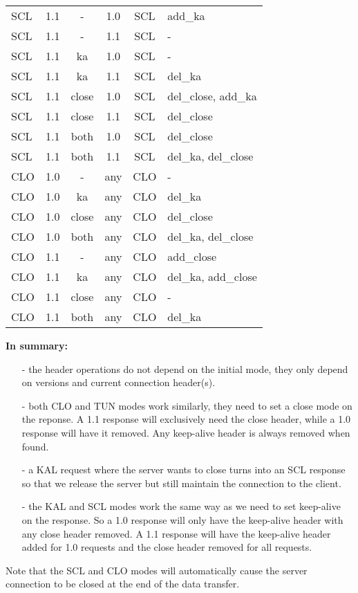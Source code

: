 \begin{longtable}{lccccl}
\hline
SCL  & 1.1   &    -    &  1.0   &   SCL   &   add\_ka \\
SCL  & 1.1   &    -    &  1.1   &   SCL   &    - \\
SCL  & 1.1   &   ka    &  1.0   &   SCL   &    - \\
SCL  & 1.1   &   ka    &  1.1   &   SCL   &   del\_ka \\
SCL  & 1.1   &  close  &  1.0   &   SCL   &   del\_close, add\_ka \\
SCL  & 1.1   &  close  &  1.1   &   SCL   &   del\_close \\
SCL  & 1.1   &  both   &  1.0   &   SCL   &   del\_close \\
SCL  & 1.1   &  both   &  1.1   &   SCL   &   del\_ka, del\_close \\
\hline
CLO  & 1.0   &    -    &  any   &   CLO   &    - \\
CLO  & 1.0   &   ka    &  any   &   CLO   &   del\_ka \\
CLO  & 1.0   &  close  &  any   &   CLO   &   del\_close \\
CLO  & 1.0   &  both   &  any   &   CLO   &   del\_ka, del\_close \\
\hline
CLO  & 1.1   &    -    &  any   &   CLO   &   add\_close \\
CLO  & 1.1   &   ka    &  any   &   CLO   &   del\_ka, add\_close \\
CLO  & 1.1   &  close  &  any   &   CLO   &    - \\
CLO  & 1.1   &  both   &  any   &   CLO   &   del\_ka \\
\end{longtable}
\vspace{3mm}

\textbf{In summary:}
\begin{itemize}
\item[-] the header operations do not depend on the initial mode, they only depend
    on versions and current connection header(s).

\item[-] both CLO and TUN modes work similarly, they need to set a close mode on the
    reponse. A 1.1 response will exclusively need the close header, while a 1.0
    response will have it removed. Any keep-alive header is always removed when
    found.

\item[-] a KAL request where the server wants to close turns into an SCL response so
    that we release the server but still maintain the connection to the client.

\item[-] the KAL and SCL modes work the same way as we need to set keep-alive on the
    response. So a 1.0 response will only have the keep-alive header with any
    close header removed. A 1.1 response will have the keep-alive header added
    for 1.0 requests and the close header removed for all requests.
\end{itemize}

Note that the SCL and CLO modes will automatically cause the server connection
to be closed at the end of the data transfer.